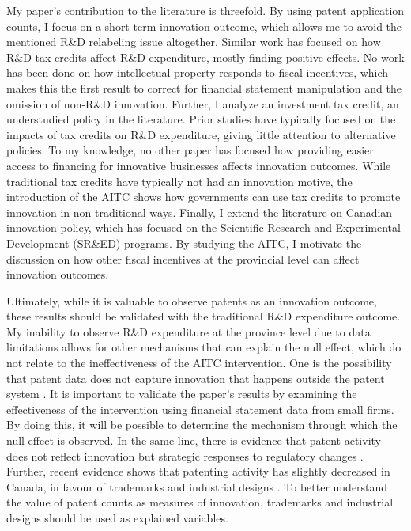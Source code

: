 \documentclass[../main.tex]{subfiles}
\begin{document}
My paper's contribution to the literature is threefold. By using patent application counts, I focus on a short-term innovation outcome, which allows me to avoid the mentioned R\&D relabeling issue altogether. Similar work has focused on how R\&D tax credits affect R\&D expenditure, mostly finding positive effects. No work has been done on how intellectual property responds to fiscal incentives, which makes this the first result to correct for financial statement manipulation and the omission of non-R\&D innovation. Further, I analyze an investment tax credit, an understudied policy in the literature. Prior studies have typically focused on the impacts of tax credits on R\&D expenditure, giving little attention to alternative policies. To my knowledge, no other paper has focused how providing easier access to financing for innovative businesses affects innovation outcomes. While traditional tax credits have typically not had an innovation motive, the introduction of the AITC shows how governments can use tax credits to promote innovation in non-traditional ways. Finally, I extend the literature on Canadian innovation policy, which has focused on the Scientific Research and Experimental Development (SR\&ED) programs. By studying the AITC, I motivate the discussion on how other fiscal incentives at the provincial level can affect innovation outcomes.

Ultimately, while it is valuable to observe patents as an innovation outcome, these results should be validated with the traditional R\&D expenditure outcome. My inability to observe R\&D expenditure at the province level due to data limitations allows for other mechanisms that can explain the null effect, which do not relate to the ineffectiveness of the AITC intervention. One is the possibility that patent data does not capture innovation that happens outside the patent system \parencite{moser13}. It is important to validate the paper’s results by examining the effectiveness of the intervention using financial statement data from small firms. By doing this, it will be possible to determine the mechanism through which the null effect is observed. In the same line, there is evidence that patent activity does not reflect innovation but strategic responses to regulatory changes \parencite{graham_mowrey04}. Further, recent evidence shows that patenting activity has slightly decreased in Canada, in favour of trademarks and industrial designs \parencite{canadianintellectualpropertyoffice22}. To better understand the value of patent counts as measures of innovation, trademarks and industrial designs should be used as explained variables. 
\end{document}
